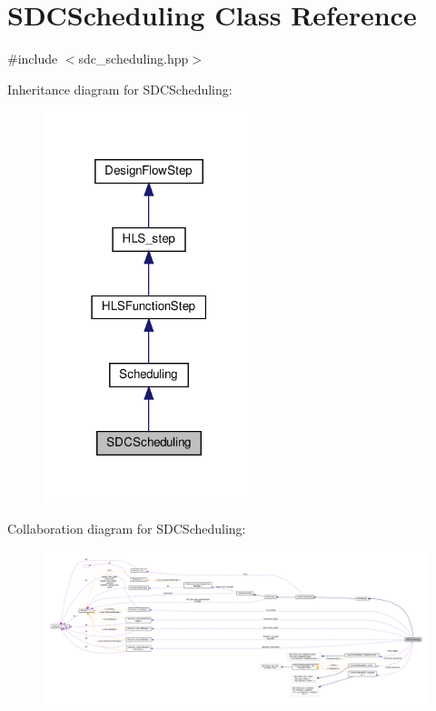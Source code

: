 \hypertarget{classSDCScheduling}{}\section{S\+D\+C\+Scheduling Class Reference}
\label{classSDCScheduling}


{\ttfamily \#include $<$sdc\+\_\+scheduling.\+hpp$>$}



Inheritance diagram for S\+D\+C\+Scheduling\+:
\nopagebreak
\begin{figure}[H]
\begin{center}
\leavevmode
\includegraphics[width=174pt]{da/d67/classSDCScheduling__inherit__graph}
\end{center}
\end{figure}


Collaboration diagram for S\+D\+C\+Scheduling\+:
\nopagebreak
\begin{figure}[H]
\begin{center}
\leavevmode
\includegraphics[width=350pt]{de/d12/classSDCScheduling__coll__graph}
\end{center}
\end{figure}
